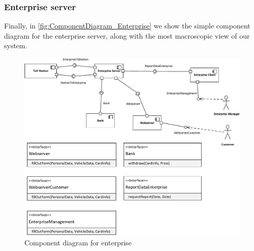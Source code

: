 \subsubsection*{Enterprise server}
Finally, in \autoref{fig:ComponentDiagram_Enterprise} we show the simple component diagram for the enterprise server, along with the most macroscopic view of our system. 
\begin{figure}[H]
\centering
\includegraphics[width=1\textwidth]{img/component_diagrams/ComponentDiagram_Enterprise}
\caption{Component diagram for enterprise}
\label{fig:ComponentDiagram_Enterprise}
\end{figure}
